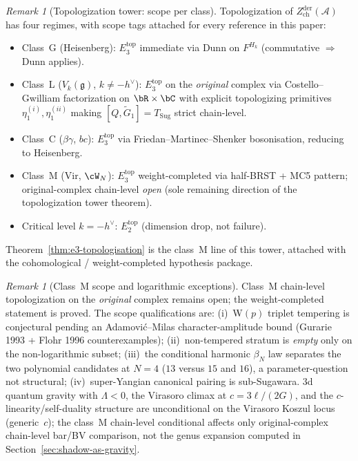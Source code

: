 \documentclass[11pt,reqno]{amsart}
\theoremstyle{definition}
\theoremstyle{remark}
\newtheorem{remark}[theorem]{Remark}
\providecommand{\cA}{\mathcal{A}}
\providecommand{\fg}{\mathfrak{g}}
\providecommand{\Vir}{\mathrm{Vir}}
\begin{document}
\begin{remark}[Topologization tower: scope per class]
\label{rem:topologization-tower}
Topologization of $Z^{\mathrm{der}}_{\mathrm{ch}}(\cA)$ has four
regimes, with scope tags attached for every reference in this
paper:
\begin{itemize}
\item Class~G (Heisenberg): $E_3^{\mathrm{top}}$ immediate via
  Dunn on $F^{H_k}$ (commutative $\Rightarrow$ Dunn applies).
\item Class~L ($V_k(\fg)$, $k \ne -h^\vee$):
  $E_3^{\mathrm{top}}$ on the \emph{original} complex via
  Costello--Gwilliam factorization on $\bR \times \bC$ with
  explicit topologizing primitives
  $\eta_1^{(i)},\eta_1^{(ii)}$ making
  $[Q, \widetilde G_1] = T_{\mathrm{Sug}}$ strict chain-level.
\item Class~C ($\beta\gamma$, $bc$): $E_3^{\mathrm{top}}$ via
  Friedan--Martinec--Shenker bosonisation, reducing to Heisenberg.
\item Class~M ($\Vir$, $\cW_N$): $E_3^{\mathrm{top}}$
  weight-completed via half-BRST + MC5 pattern; original-complex
  chain-level \emph{open} (sole remaining direction of the
  topologization tower theorem).
\item Critical level $k = -h^\vee$: $E_2^{\mathrm{top}}$ (dimension
  drop, not failure).
\end{itemize}
Theorem~\ref{thm:e3-topologisation} is the
class~M line of this tower, attached with the cohomological /
weight-completed hypothesis package.
\end{remark}

\begin{remark}[Class~M scope and logarithmic exceptions]
\label{rem:class-m-scope}
Class~M chain-level topologization on the \emph{original}
complex remains open; the weight-completed statement is proved.
The scope qualifications are: (i)~W$(p)$ triplet tempering is conjectural
pending an Adamovi\'c--Milas character-amplitude bound
(Gurarie 1993 + Flohr 1996 counterexamples); (ii)~non-tempered
stratum is \emph{empty} only on the non-logarithmic subset;
(iii)~the conditional harmonic $\beta_N$ law separates the two
polynomial candidates at $N = 4$ ($13$ versus $15$ and $16$),
a parameter-question not structural; (iv)~super-Yangian canonical
pairing is sub-Sugawara. 3d quantum gravity with $\Lambda < 0$,
the Virasoro climax at $c = 3\ell/(2G)$, and the
$c$-linearity/self-duality structure are unconditional on the
Virasoro Koszul locus (generic~$c$); the class~M chain-level
conditional affects only original-complex chain-level bar/BV
comparison, not the genus expansion computed in
Section~\ref{sec:shadow-as-gravity}.
\end{remark}
\end{document}
